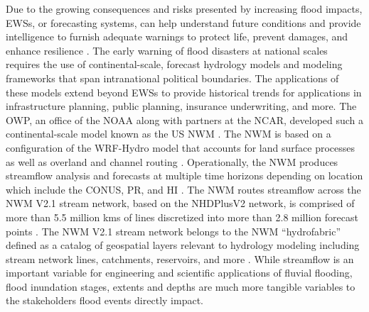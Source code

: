 \documentclass[water,article,submit,pdftex,moreauthors]{dependencies/Definitions/mdpi}
\begin{document}
Due to the growing consequences and risks presented by increasing flood impacts, \acp{EWS}, or forecasting systems, can help understand future conditions and provide intelligence to furnish adequate warnings to protect life, prevent damages, and enhance resilience \cite{stromberg2007natural,cools2016lessons,unisdr2015making,baudoin2014early,golnaraghi2012overview,unep2012early,liu2018review}.
The early warning of flood disasters at national scales requires the use of continental-scale, forecast hydrology models and modeling frameworks that span intranational political boundaries.
The applications of these models extend beyond \acp{EWS} to provide historical trends for applications in infrastructure planning, public planning, insurance underwriting, and more.
The \ac{OWP}, an office of the \ac{NOAA} along with partners at the \ac{NCAR}, developed such a continental-scale model known as the \ac{US} \ac{NWM} \cite{salas2018towards,gochis2021wrf,cosgrove2019evolution,cohen2018featured,noaa2016national,water2022nwm}.
The \ac{NWM} is based on a configuration of the \ac{WRF-Hydro} model that accounts for land surface processes as well as overland and channel routing \cite{gochis2021wrf,salas2018towards,cosgrove2019evolution}.
Operationally, the \ac{NWM} produces streamflow analysis and forecasts at multiple time horizons depending on location which include the \ac{CONUS}, \ac{PR}, and \ac{HI} \cite{cosgrove2019evolution,noaa2016national,water2022nwm}.
The \ac{NWM} routes streamflow across the \ac{NWM} \ac{V2.1} stream network, based on the \ac{NHDPlusV2} network, is comprised of more than 5.5 million \acp{km} of lines discretized into more than 2.8 million forecast points \cite{aristizabal2022extending}.
The \ac{NWM} \ac{V2.1} stream network belongs to the \ac{NWM} ``hydrofabric'' defined as a catalog of geospatial layers relevant to hydrology modeling including stream network lines, catchments, reservoirs, and more \cite{water2022nwm,cosgrove2019evolution}.
While streamflow is an important variable for engineering and scientific applications of fluvial flooding, flood inundation stages, extents and depths are much more tangible variables to the stakeholders flood events directly impact.
\end{document}
